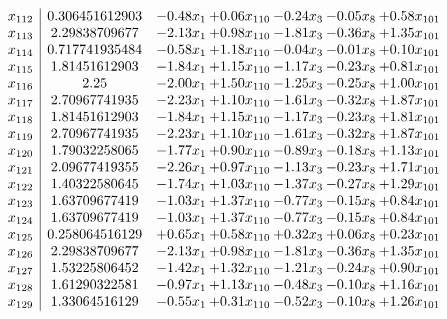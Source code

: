 \documentclass[8pt]{article}
\begin{document}
\[\begin{array}{c| c c@{\hskip 2pt} c@{\hskip 2pt} c@{\hskip 2pt} c@{\hskip 2pt} c@{\hskip 2pt} }
 x_{112}   &  0.306451612903 & -0.48 x_{1} & +  0.06 x_{110} & -0.24 x_{3} & -0.05 x_{8} & +  0.58 x_{101}\\
 x_{113}   &  2.29838709677 & -2.13 x_{1} & +  0.98 x_{110} & -1.81 x_{3} & -0.36 x_{8} & +  1.35 x_{101}\\
 x_{114}   &  0.717741935484 & -0.58 x_{1} & +  1.18 x_{110} & -0.04 x_{3} & -0.01 x_{8} & +  0.10 x_{101}\\
 x_{115}   &  1.81451612903 & -1.84 x_{1} & +  1.15 x_{110} & -1.17 x_{3} & -0.23 x_{8} & +  0.81 x_{101}\\
 x_{116}   &  2.25 & -2.00 x_{1} & +  1.50 x_{110} & -1.25 x_{3} & -0.25 x_{8} & +  1.00 x_{101}\\
 x_{117}   &  2.70967741935 & -2.23 x_{1} & +  1.10 x_{110} & -1.61 x_{3} & -0.32 x_{8} & +  1.87 x_{101}\\
 x_{118}   &  1.81451612903 & -1.84 x_{1} & +  1.15 x_{110} & -1.17 x_{3} & -0.23 x_{8} & +  1.81 x_{101}\\
 x_{119}   &  2.70967741935 & -2.23 x_{1} & +  1.10 x_{110} & -1.61 x_{3} & -0.32 x_{8} & +  1.87 x_{101}\\
 x_{120}   &  1.79032258065 & -1.77 x_{1} & +  0.90 x_{110} & -0.89 x_{3} & -0.18 x_{8} & +  1.13 x_{101}\\
 x_{121}   &  2.09677419355 & -2.26 x_{1} & +  0.97 x_{110} & -1.13 x_{3} & -0.23 x_{8} & +  1.71 x_{101}\\
 x_{122}   &  1.40322580645 & -1.74 x_{1} & +  1.03 x_{110} & -1.37 x_{3} & -0.27 x_{8} & +  1.29 x_{101}\\
 x_{123}   &  1.63709677419 & -1.03 x_{1} & +  1.37 x_{110} & -0.77 x_{3} & -0.15 x_{8} & +  0.84 x_{101}\\
 x_{124}   &  1.63709677419 & -1.03 x_{1} & +  1.37 x_{110} & -0.77 x_{3} & -0.15 x_{8} & +  0.84 x_{101}\\
 x_{125}   &  0.258064516129 & +  0.65 x_{1} & +  0.58 x_{110} & +  0.32 x_{3} & +  0.06 x_{8} & +  0.23 x_{101}\\
 x_{126}   &  2.29838709677 & -2.13 x_{1} & +  0.98 x_{110} & -1.81 x_{3} & -0.36 x_{8} & +  1.35 x_{101}\\
 x_{127}   &  1.53225806452 & -1.42 x_{1} & +  1.32 x_{110} & -1.21 x_{3} & -0.24 x_{8} & +  0.90 x_{101}\\
 x_{128}   &  1.61290322581 & -0.97 x_{1} & +  1.13 x_{110} & -0.48 x_{3} & -0.10 x_{8} & +  1.16 x_{101}\\
 x_{129}   &  1.33064516129 & -0.55 x_{1} & +  0.31 x_{110} & -0.52 x_{3} & -0.10 x_{8} & +  1.26 x_{101}\\

\end{array}\]
\end{document}

